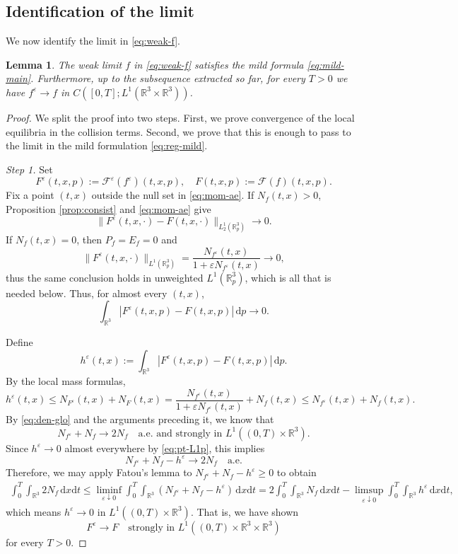 \documentclass[10pt,reqno]{amsart}
\numberwithin{equation}{section}
\newtheorem{lemma}{Lemma}[section]
\theoremstyle{definition}
\newcommand{\R}{\mathbb R}
\newcommand{\dx}{\mathrm{d}x}
\newcommand{\dpp}{\mathrm{d}p}
\newcommand{\dt}{\mathrm{d}t}
\newcommand{\e}{\varepsilon}
\newcommand{\calF}{\mathcal F}
\newcommand{\bq}{\begin{equation}}
\newcommand{\eq}{\end{equation}}
\begin{document}
 
%
%
%
%
%
%

\subsection{Identification of the limit }

We now identify the limit in \eqref{eq:weak-f}.
\begin{lemma}
     The weak limit $f$ in \eqref{eq:weak-f} satisfies the mild formula \eqref{eq:mild-main}. Furthermore, up to the subsequence extracted so far, for every $T>0$ we have $f^\e \to f$ in $C([0,T];L^1(\R^3\times\R^3))$.
\end{lemma} 
\begin{proof}
We split the proof into two steps. First, we prove convergence of the local equilibria in the collision terms. Second, we prove that this is enough to pass to the limit in the mild formulation \eqref{eq:reg-mild}.  

\textit{Step 1.} Set
\[
 F^\e(t,x,p):=\calF^\e(f^\e)(t,x,p),  \quad  F(t,x,p):=\calF(f)(t,x,p).
\]
Fix a point $(t,x)$ outside the null set in \eqref{eq:mom-ae}.  If $N_f(t,x)>0$, Proposition \ref{prop:consist} and \eqref{eq:mom-ae} give
\[
 \|F^\e(t,x,\cdot)-F(t,x,\cdot)\|_{L^1_2(\R^3_p)}\to0.
\]
If $N_f(t,x)=0$, then $P_f=E_f=0$ and
\[
 \|F^\e(t,x,\cdot)\|_{L^1(\R^3_p)}  =\frac{N_{f^\e}(t,x)}{1+\e N_{f^\e}(t,x)}\to0,
\]
thus the same conclusion holds in unweighted $L^1(\R^3_p)$, which is all that is needed below.  Thus, for almost every $(t,x)$,
\bq \label{eq:pt-L1p}
 \int_{\R^3}|F^\e(t,x,p)-F(t,x,p)|\,\dpp\to0.
\eq
 

Define
\[
 h^\e(t,x):=\int_{\R^3}|F^\e(t,x,p)-F(t,x,p)|\,\dpp.
\]
By the local mass formulas,
\[
 h^\e(t,x) \leq N_{F^\e}(t,x)+N_F(t,x) =\frac{N_{f^\e}(t,x)}{1+\e N_{f^\e}(t,x)}+N_f(t,x) \leq N_{f^\e}(t,x)+N_f(t,x).
\]
By \eqref{eq:den-glo} and the arguments preceding it, we know that 
\[
 N_{f^\e} + N_f \to 2N_f  \quad\text{a.e. and strongly in }  L^1((0,T)\times\R^3).
\]
Since $h^\e\to0$ almost everywhere by \eqref{eq:pt-L1p}, this implies
\begin{equation*}
    N_{f^\e} + N_f - h^\e \to 2N_f \quad \text{a.e.}
\end{equation*}
Therefore, we may apply Fatou's lemma to $N_{f^\e} + N_f - h^\e \ge 0$ to obtain
\begin{align*}
    \int_0^T \int_{\R^3} 2N_f \, \dx \dt  \le \liminf_{\e \downarrow 0} \int_0^T \int_{\R^3} (N_{f^\e} + N_f - h^\e) \, \dx \dt = 2 \int_0^T \int_{\R^3} N_f \,\dx \dt - \limsup_{\e\downarrow 0} \int_0^T \int_{\R^3} h^\e \,\dx \dt,
\end{align*}
which means $h^\e \to 0$ in $L^1((0,T)\times \R^3)$.  That is, we have shown
\bq \label{eq:F-str-glo}
 F^\e\to F \quad\text{strongly in }L^1((0,T)\times\R^3\times\R^3)
\eq
for every $T>0$. 


\end{proof}
\end{document}

